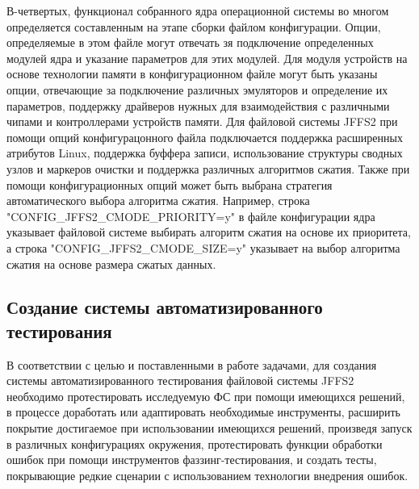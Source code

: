 В-четвертых, функционал собранного ядра операционной системы во многом определяется составленным на этапе сборки файлом конфигурации. Опции, определяемые в этом файле могут отвечать зя подключение определенных модулей ядра и указание параметров для этих модулей. Для модуля устройств на основе технологии памяти в конфигурационном файле могут быть указаны опции, отвечающие за подключение различных эмуляторов и определение их параметров, поддержку драйверов нужных для взаимодействия с различными чипами и контроллерами устройств памяти. Для файловой системы JFFS2 при помощи опций конфигурацонного файла подключается поддержка расширенных атрибутов Linux, поддержка буффера записи, использование структуры сводных узлов и маркеров очистки и поддержка различных алгоритмов сжатия. Также при помощи конфигурационных опций может быть выбрана стратегия автоматического выбора алгоритма сжатия. Например, строка "CONFIG\_JFFS2\_CMODE\_PRIORITY=y" в файле конфигурации ядра указывает файловой системе выбирать алгоритм сжатия на основе их приоритета, а строка "CONFIG\_JFFS2\_CMODE\_SIZE=y" указывает на выбор алгоритма сжатия на основе размера сжатых данных.

\subsection{Создание системы автоматизированного тестирования}

В соответствии с целью и поставленными в работе задачами, для создания системы автоматизированного тестирования файловой системы JFFS2 необходимо протестировать исследуемую ФС при помощи имеющихся решений, в процессе доработать или адаптировать необходимые инструменты, расширить покрытие достигаемое при использовании имеющихся решений, произведя запуск в различных конфигурациях окружения, протестировать функции обработки ошибок при помощи инструментов фаззинг-тестирования, и создать тесты, покрывающие редкие сценарии с использованием технологии внедрения ошибок.

\newpage
